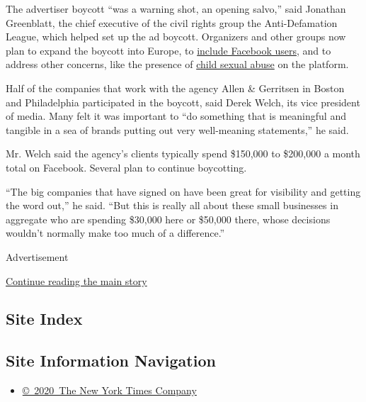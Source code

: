 The advertiser boycott ``was a warning shot, an opening salvo,'' said
Jonathan Greenblatt, the chief executive of the civil rights group the
Anti-Defamation League, which helped set up the ad boycott. Organizers
and other groups now plan to expand the boycott into Europe, to
\href{https://actions.sumofus.org/a/facebook-adblock-landing}{include
Facebook users}, and to address other concerns, like the presence of
\href{https://www.keepkidssafeonline.org/stop-hate-for-profit-facebook-pr}{child
sexual abuse} on the platform.

Half of the companies that work with the agency Allen \& Gerritsen in
Boston and Philadelphia participated in the boycott, said Derek Welch,
its vice president of media. Many felt it was important to ``do
something that is meaningful and tangible in a sea of brands putting out
very well-meaning statements,'' he said.

Mr. Welch said the agency's clients typically spend \$150,000 to
\$200,000 a month total on Facebook. Several plan to continue
boycotting.

``The big companies that have signed on have been great for visibility
and getting the word out,'' he said. ``But this is really all about
these small businesses in aggregate who are spending \$30,000 here or
\$50,000 there, whose decisions wouldn't normally make too much of a
difference.''

Advertisement

\protect\hyperlink{after-bottom}{Continue reading the main story}

\hypertarget{site-index}{%
\subsection{Site Index}\label{site-index}}

\hypertarget{site-information-navigation}{%
\subsection{Site Information
Navigation}\label{site-information-navigation}}

\begin{itemize}
\tightlist
\item
  \href{https://help.nytimes.com/hc/en-us/articles/115014792127-Copyright-notice}{©~2020~The
  New York Times Company}
\end{itemize}

